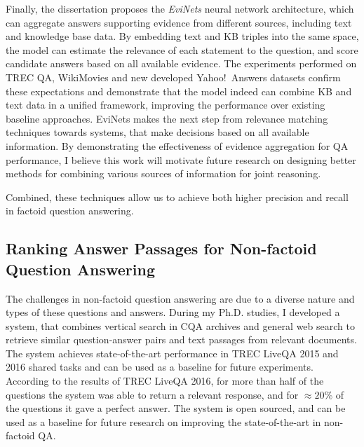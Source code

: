 Finally, the dissertation proposes the \textit{EviNets} neural network architecture, which can aggregate answers supporting evidence from different sources, including text and knowledge base data.
By embedding text and KB triples into the same space, the model can estimate the relevance of each statement to the question, and score candidate answers based on all available evidence.
The experiments performed on TREC QA, WikiMovies and new developed Yahoo!~Answers datasets confirm these expectations and demonstrate that the model indeed can combine KB and text data in a unified framework, improving the performance over existing baseline approaches.
EviNets makes the next step from relevance matching techniques towards systems, that make decisions based on all available information.
By demonstrating the effectiveness of evidence aggregation for QA performance, I believe this work will motivate future research on designing better methods for combining various sources of information for joint reasoning.

Combined, these techniques allow us to achieve both higher precision and recall in factoid question answering.

\subsection{Ranking Answer Passages for Non-factoid Question Answering}
\label{section:conclusion:summary:non-factoid}

The challenges in non-factoid question answering are due to a diverse nature and types of these questions and answers.
During my Ph.D. studies, I developed a system, that combines vertical search in CQA archives and general web search to retrieve similar question-answer pairs and text passages from relevant documents.
The system achieves state-of-the-art performance in TREC LiveQA 2015 and 2016 shared tasks and can be used as a baseline for future experiments.
According to the results of TREC LiveQA 2016, for more than half of the questions the system was able to return a relevant response, and for $\approx 20\%$ of the questions it gave a perfect answer.
The system is open sourced, and can be used as a baseline for future research on improving the state-of-the-art in non-factoid QA.

